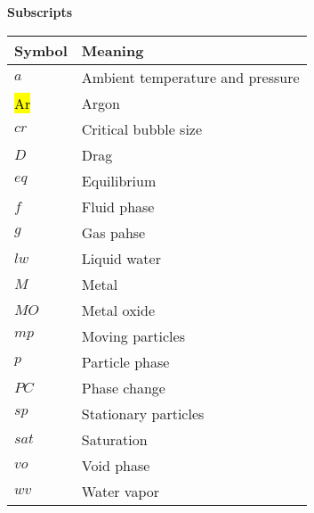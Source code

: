 \textbf{Subscripts}
\begin{table}[h!]
    \centering
    \begin{tabular}{w{c}{2cm} m{7cm}}
        \toprule
        Symbol & Meaning \\ 
        \midrule
        $a$                     & Ambient temperature and pressure \\
        \hl{Ar}                    & Argon  \\
        $cr$                    & Critical bubble size \\
        $D$                     & Drag \\
        $eq$                    & Equilibrium \\
        $f$                     & Fluid phase\\
        $g$                     & Gas pahse\\
        $lw$                    & Liquid water \\
        $M$                     & Metal \\
        $MO$                    & Metal oxide\\
        $mp$                    & Moving particles \\
        $p$                     & Particle phase  \\
        $PC$                    & Phase change \\
        $sp$                    & Stationary particles \\
        $sat$                   & Saturation \\
        $vo$                    & Void phase \\
        $wv$                    & Water vapor \\

        \bottomrule
    \end{tabular}
    \label{tab:Nomenclature}
\end{table}